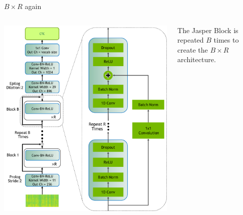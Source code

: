 \documentclass[aspectratio=169,xcolor={dvipsnames,svgnames}]{beamer}
\begin{document}
\begin{frame}[label={sec:orge99d87b}]{\(B\times R\) again}
\begin{columns}
\begin{column}{0.45\columnwidth}
\begin{center}
\includegraphics[width=.9\linewidth]{org-download-images/Contribution/2024-08-28_07-44-17_screenshot.png}
\end{center}
\end{column}

\begin{column}{0.55\columnwidth}
The Jasper Block is repeated \(B\) times to create the
\(B\times R\) architecture.
\end{column}
\end{columns}
\end{frame}
\end{document}
